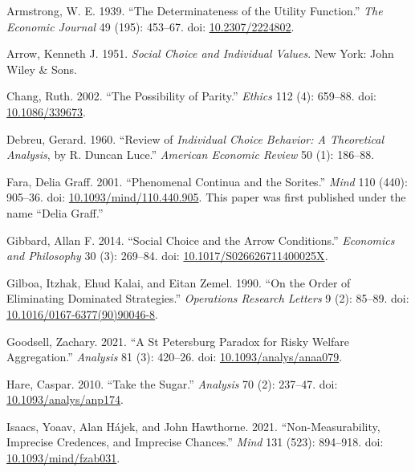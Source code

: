 \documentclass[
  11pt,
  letterpaper,
  DIV=11,
  numbers=noendperiod,
  twoside]{scrartcl}
\newlength{\cslhangindent}
\newenvironment{CSLReferences}[2] %
 {\begin{list}{}{%
  \setlength{\itemindent}{0pt}
  \setlength{\leftmargin}{0pt}
  \setlength{\parsep}{0pt}
  \ifodd #1
   \setlength{\leftmargin}{\cslhangindent}
   \setlength{\itemindent}{-1\cslhangindent}
  \fi
  \setlength{\itemsep}{#2\baselineskip}}}
 {\end{list}}
\begin{document}
\label{refs}
\begin{CSLReferences}{1}{0}
Armstrong, W. E. 1939. {``The Determinateness of the Utility
Function.''} \emph{The Economic Journal} 49 (195): 453--67. doi:
\href{https://doi.org/10.2307/2224802}{10.2307/2224802}.

Arrow, Kenneth J. 1951. \emph{Social Choice and Individual Values}. New
York: John Wiley \& Sons.

Chang, Ruth. 2002. {``The Possibility of Parity.''} \emph{Ethics} 112
(4): 659--88. doi:
\href{https://doi.org/10.1086/339673}{10.1086/339673}.

Debreu, Gerard. 1960. {``Review of \emph{Individual Choice Behavior: A
Theoretical Analysis}, by {R. Duncan Luce}.''} \emph{American Economic
Review} 50 (1): 186--88.

Fara, Delia Graff. 2001. {``Phenomenal Continua and the Sorites.''}
\emph{Mind} 110 (440): 905--36. doi:
\href{https://doi.org/10.1093/mind/110.440.905}{10.1093/mind/110.440.905}.
This paper was first published under the name {``Delia Graff.''}

Gibbard, Allan F. 2014. {``Social Choice and the Arrow Conditions.''}
\emph{Economics and Philosophy} 30 (3): 269--84. doi:
\href{https://doi.org/10.1017/S026626711400025X}{10.1017/S026626711400025X}.

Gilboa, Itzhak, Ehud Kalai, and Eitan Zemel. 1990. {``On the Order of
Eliminating Dominated Strategies.''} \emph{Operations Research Letters}
9 (2): 85--89. doi:
\href{https://doi.org/10.1016/0167-6377(90)90046-8}{10.1016/0167-6377(90)90046-8}.

Goodsell, Zachary. 2021. {``A St Petersburg Paradox for Risky Welfare
Aggregation.''} \emph{Analysis} 81 (3): 420--26. doi:
\href{https://doi.org/10.1093/analys/anaa079}{10.1093/analys/anaa079}.

Hare, Caspar. 2010. {``Take the Sugar.''} \emph{Analysis} 70 (2):
237--47. doi:
\href{https://doi.org/10.1093/analys/anp174}{10.1093/analys/anp174}.

Isaacs, Yoaav, Alan Hájek, and John Hawthorne. 2021.
{``Non-Measurability, Imprecise Credences, and Imprecise Chances.''}
\emph{Mind} 131 (523): 894--918. doi:
\href{https://doi.org/10.1093/mind/fzab031}{10.1093/mind/fzab031}.


\end{CSLReferences}
\end{document}
